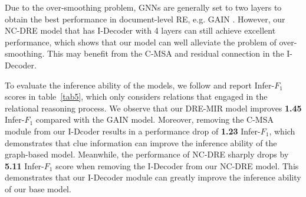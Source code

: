 \documentclass[sigconf,natbib=true]{acmart}
\begin{document}
\begin{table}[]
\centering
{}
\caption{\label{tab3} Ablation study of NC-DRE on the development set of DocRED.
}
\end{table}

\begin{table}[]
\centering
{}
\caption{\label{tab4} Performance of NC-DRE with different number of layers in the I-Decoder module on the development set of DocRED.}
\end{table}


Due to the over-smoothing problem, GNNs are generally set to two layers to obtain the best performance in document-level RE, e.g. GAIN \cite{c:118}.
However, our NC-DRE model that has I-Decoder with 4 layers can still achieve excellent performance, which shows that our model can well alleviate the problem of over-smoothing.
This may benefit from the C-MSA and residual connection in the I-Decoder.

To evaluate the inference ability of the models, we follow \cite{c:118,c:121} and report Infer-$F_1$ scores in table~\ref{tab5}, which only considers relations that engaged in the relational reasoning process. 
We observe that our DRE-MIR model improves \textbf{1.45} Infer-$F_1$ compared with the GAIN model.
Moreover, removing the C-MSA module from our I-Dcoder results in a performance drop of \textbf{1.23} Infer-$F_1$, which demonstrates that clue information can improve the inference ability of the graph-based model.
Meanwhile, the performance of NC-DRE sharply drops by \textbf{5.11} Infer-$F_1$ score when removing the I-Decoder from our NC-DRE model.
This demonstrates that our I-Decoder module can greatly improve the inference ability of our base model.
\end{document}
